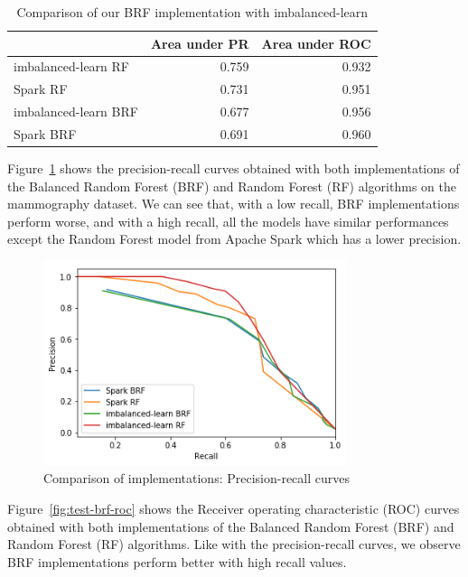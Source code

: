 \documentclass[conference]{IEEEtran}
\begin{document}
\begin{table}[htbp]
\caption{Comparison of our BRF implementation with imbalanced-learn}
\begin{center}
\begin{tabular}{|l|r|r|}
\cline{2-3}
\multicolumn{1}{c|}{} &  Area under PR &  Area under ROC \\
\hline
imbalanced-learn RF  &          0.759 &           0.932 \\
Spark RF             &          0.731 &           0.951 \\
imbalanced-learn BRF &          0.677 &           0.956 \\
Spark BRF            &          0.691 &           0.960 \\
\hline
\end{tabular}
\label{table:test_brf_results}
\end{center}
\end{table}

Figure~\ref{fig:test-brf-precision-recall} shows the precision-recall curves obtained with both implementations of the Balanced Random Forest (BRF) and Random Forest (RF) algorithms on the mammography dataset. We can see that, with a low recall, BRF implementations perform worse, and with a high recall, all the models have similar performances except the Random Forest model from Apache Spark which has a lower precision.

\begin{figure}[htbp]
\centerline{\includegraphics[height=6cm, keepaspectratio]{Figures/test_brf_pr.png}}
\caption{Comparison of implementations: Precision-recall curves}
\label{fig:test-brf-precision-recall}
\end{figure}

Figure~\ref{fig:test-brf-roc} shows the Receiver operating characteristic (ROC) curves obtained with both implementations of the Balanced Random Forest (BRF) and Random Forest (RF) algorithms. Like with the precision-recall curves, we observe BRF implementations perform better with high recall values. 
\end{document}
